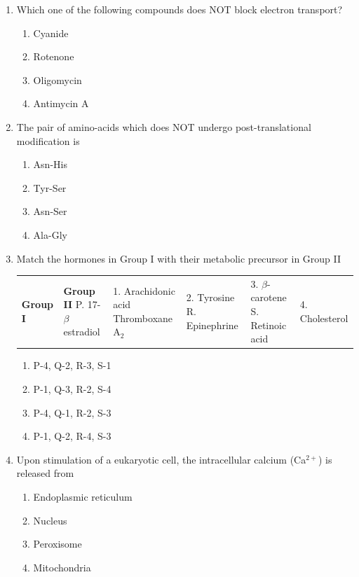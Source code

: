 \documentclass[journal,12pt,onecolumn]{IEEEtran}
\begin{document}
\begin{enumerate}[label=\arabic*.]
\item Which one of the following compounds does NOT block electron transport?
\begin{multicols}{4}
\begin{enumerate}[label=(\Alph*)]
\item Cyanide
\item Rotenone
\item Oligomycin
\item Antimycin A
\end{enumerate}
\end{multicols}

\item The pair of amino-acids which does NOT undergo post-translational modification is
\begin{multicols}{4}
\begin{enumerate}[label=(\Alph*)]
\item Asn-His
\item Tyr-Ser
\item Asn-Ser
\item Ala-Gly
\end{enumerate}
\end{multicols}

\item Match the hormones in Group I with their metabolic precursor in Group II
\begin{center}
\begin{tabular}{p{7cm} p{8cm}}
\textbf{Group I} & \textbf{Group II} 
P. 17-$\beta$ estradiol & 1. Arachidonic acid 
 Thromboxane A$_2$   & 2. Tyrosine 
R. Epinephrine         & 3. $\beta$-carotene 
S. Retinoic acid       & 4. Cholesterol 
\end{tabular}
\end{center}
\begin{multicols}{2}
\begin{enumerate}[label=(\Alph*)]
\item P-4, Q-2, R-3, S-1
\item P-1, Q-3, R-2, S-4
\item P-4, Q-1, R-2, S-3
\item P-1, Q-2, R-4, S-3
\end{enumerate}
\end{multicols}

\item Upon stimulation of a eukaryotic cell, the intracellular calcium (Ca$^{2+}$) is released from
\begin{multicols}{4}
\begin{enumerate}[label=(\Alph*)]
\item Endoplasmic reticulum
\item Nucleus
\item Peroxisome
\item Mitochondria
\end{enumerate}
\end{multicols}


\end{enumerate}
\end{document}
